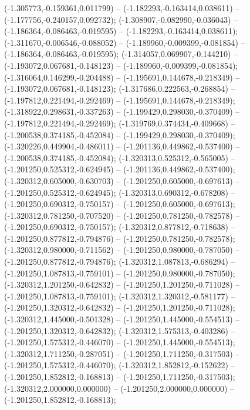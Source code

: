  (-1.305773,-0.159361,0.011799) -- (-1.182293,-0.163414,0.038611) -- (-1.177756,-0.240157,0.092732);
 (-1.308907,-0.082990,-0.036043) -- (-1.186364,-0.086463,-0.019595) -- (-1.182293,-0.163414,0.038611);
 (-1.311670,-0.006546,-0.088052) -- (-1.189960,-0.009399,-0.081854) -- (-1.186364,-0.086463,-0.019595);
 (-1.314057,0.069907,-0.144210) -- (-1.193072,0.067681,-0.148123) -- (-1.189960,-0.009399,-0.081854);
 (-1.316064,0.146299,-0.204488) -- (-1.195691,0.144678,-0.218349) -- (-1.193072,0.067681,-0.148123);
 (-1.317686,0.222563,-0.268854) -- (-1.197812,0.221494,-0.292469) -- (-1.195691,0.144678,-0.218349);
 (-1.318922,0.298631,-0.337263) -- (-1.199429,0.298030,-0.370409) -- (-1.197812,0.221494,-0.292469);
 (-1.319769,0.374434,-0.409668) -- (-1.200538,0.374185,-0.452084) -- (-1.199429,0.298030,-0.370409);
 (-1.320226,0.449904,-0.486011) -- (-1.201136,0.449862,-0.537400) -- (-1.200538,0.374185,-0.452084);
 (-1.320313,0.525312,-0.565005) -- (-1.201250,0.525312,-0.624945) -- (-1.201136,0.449862,-0.537400);
 (-1.320312,0.605000,-0.630703) -- (-1.201250,0.605000,-0.697613) -- (-1.201250,0.525312,-0.624945);
 (-1.320313,0.690312,-0.678208) -- (-1.201250,0.690312,-0.750157) -- (-1.201250,0.605000,-0.697613);
 (-1.320312,0.781250,-0.707520) -- (-1.201250,0.781250,-0.782578) -- (-1.201250,0.690312,-0.750157);
 (-1.320312,0.877812,-0.718638) -- (-1.201250,0.877812,-0.794876) -- (-1.201250,0.781250,-0.782578);
 (-1.320312,0.980000,-0.711562) -- (-1.201250,0.980000,-0.787050) -- (-1.201250,0.877812,-0.794876);
 (-1.320312,1.087813,-0.686294) -- (-1.201250,1.087813,-0.759101) -- (-1.201250,0.980000,-0.787050);
 (-1.320312,1.201250,-0.642832) -- (-1.201250,1.201250,-0.711028) -- (-1.201250,1.087813,-0.759101);
 (-1.320312,1.320312,-0.581177) -- (-1.201250,1.320312,-0.642832) -- (-1.201250,1.201250,-0.711028);
 (-1.320312,1.445000,-0.501328) -- (-1.201250,1.445000,-0.554513) -- (-1.201250,1.320312,-0.642832);
 (-1.320312,1.575313,-0.403286) -- (-1.201250,1.575312,-0.446070) -- (-1.201250,1.445000,-0.554513);
 (-1.320312,1.711250,-0.287051) -- (-1.201250,1.711250,-0.317503) -- (-1.201250,1.575312,-0.446070);
 (-1.320312,1.852812,-0.152622) -- (-1.201250,1.852812,-0.168813) -- (-1.201250,1.711250,-0.317503);
 (-1.320312,2.000000,0.000000) -- (-1.201250,2.000000,0.000000) -- (-1.201250,1.852812,-0.168813);
